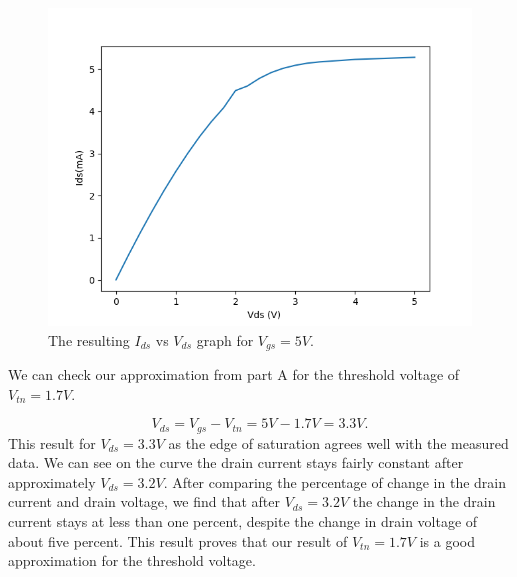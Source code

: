 		\begin{figure}[h!]
		\centering
		\includegraphics[scale=0.75]{../data/nmos_5v.png}
		\caption{The resulting $I_{ds}$ vs $V_{ds}$ graph for $V_{gs}=5V$.}
		\label{fig:nmos_5v}
		\end{figure}

		\FloatBarrier
		We can check our approximation from part A for the threshold voltage of $V_{tn} = 1.7 V$.
		
\begin{equation}
	\label{eq:thresh_5V}
		V_{ds} = V_{gs} - V_{tn} = 5 V - 1.7 V = 3.3 V.	
\end{equation}
This result for $V_{ds} = 3.3 V$ as the edge of saturation agrees well with the measured data. 
We can see on the curve the drain current stays fairly constant after approximately $V_{ds}=3.2 V$.
After comparing the percentage of change in the drain current and drain voltage, we find that after $V_{ds} = 3.2 V$ the change in the drain current stays at less than one percent, despite the change in drain voltage of about five percent. 
This result proves that our result of $V_{tn} = 1.7 V$ is a good approximation for the threshold voltage.
